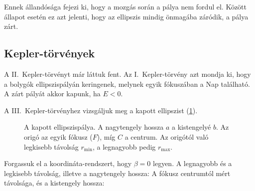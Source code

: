    Ennek állandósága fejezi ki, hogy a mozgás során a pálya nem fordul el. Között állapot esetén ez azt jelenti, hogy az ellipszis mindig önmagába záródik, a pálya zárt. 
   
  \subsection{Kepler-törvények}
   
   A II.\ Kepler-törvényt már láttuk fent. Az I.\ Kepler-törvény azt mondja ki, hogy a bolygók ellipszispályán keringenek, melynek egyik fókuszában a Nap található. A zárt pályát akkor kapunk, ha $E<0$. 
   
   A III.\ Kepler-törvényhez vizsgáljuk meg a kapott ellipszist (\ref{fig:A13-ellipszis}).
   \begin{figure}[ht!]
    \centering
    \caption{A kapott ellipszispálya. A nagytengely hossza $a$ a kistengelyé $b$. Az origó az egyik fókusz ($F$), míg $C$ a centrum. Az origótól való legkisebb távolság $r_\text{min}$, a legnagyobb pedig $r_\text{max}$.}\label{fig:A13-ellipszis}
   \end{figure}
   Forgassuk el a koordináta-rendszert, hogy $\beta=0$ legyen. A legnagyobb és a legkisebb távolság, illetve a nagytengely hossza:
   A fókusz centrumtól mért távolsága, és a kistengely hossza:

